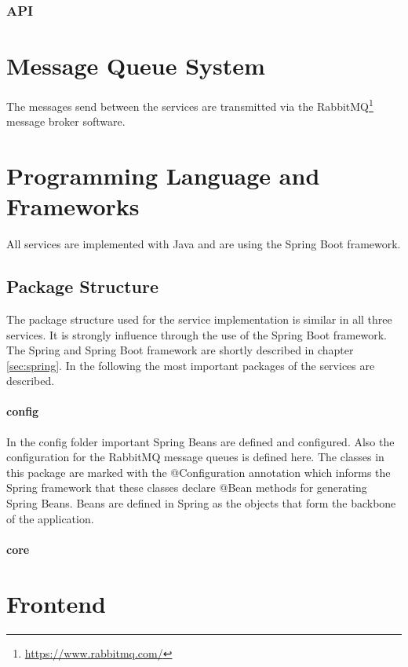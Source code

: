 \subsubsection{API}
\label{sec:benchmarking_api}


\section{Message Queue System}
\label{sec:message_queue}
The messages send between the services are transmitted via the RabbitMQ\footnote{\url{https://www.rabbitmq.com/}} message broker software.


\section{Programming Language and Frameworks}
\label{sec:prog_lang_and_framework}
All services are implemented with Java and are using the Spring Boot framework.

\subsection{Package Structure}
\label{sec:folder_structure}
The package structure used for the service implementation is similar in all three services.
It is strongly influence through the use of the Spring Boot framework.
The Spring and Spring Boot framework are shortly described in chapter \ref{sec:spring}.
In the following the most important packages of the services are described.

\paragraph{config}
In the config folder important Spring Beans are defined and configured.
Also the configuration for the RabbitMQ message queues is defined here.
The classes in this package are marked with the @Configuration annotation which informs the Spring framework that these classes declare @Bean methods for generating Spring Beans.
Beans are defined in Spring as the objects that form the backbone of the application.

\paragraph{core}



\section{Frontend}
\label{sec:frontend}